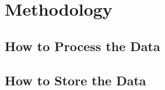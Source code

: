 \chapter{Methodology}\label{ch:methodology} %
\section{How to Process the Data} %
\label{sec:how_to_process_the_data}


\section{How to Store the Data} %
\label{sec:how_to_store_the_data}

